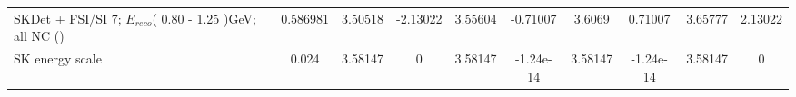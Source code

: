 {\begin{landscape}
\begin{table}
{\begin{tabular}{| l | S | S  S | S  S | S  S | S  S | }
      SKDet + FSI/SI  7; $E_{reco}$( 0.80 - 1.25 )GeV; all NC (\nueCConepi{})                           &        0.586981 &         3.50518 &        -2.13022 &         3.55604 &        -0.71007 &          3.6069 &         0.71007 &         3.65777 &         2.13022 \\ 
      SK energy scale &           0.024 &         3.58147 &               0 &         3.58147 &       {-1.24e-14} &         3.58147 &       {-1.24e-14} &         3.58147 &               0 \\ 
      \bottomrule
    \end{tabular}
   } %
  \end{table}
\end{landscape}
} %

